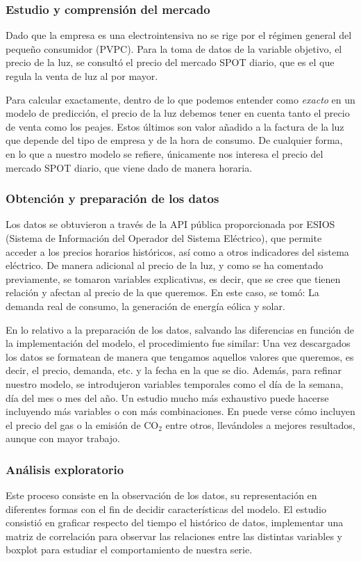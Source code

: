 \subsubsection{Estudio y comprensión del mercado}
%
%
%
Dado que la empresa es una electrointensiva no se rige por el régimen general del pequeño consumidor (PVPC). Para la toma de datos de la variable objetivo, el precio de la luz, se consultó el precio del mercado SPOT diario, que es el que regula la venta de luz al por mayor.

Para calcular exactamente, dentro de lo que podemos entender como \textit{exacto} en un modelo de predicción, el precio de la luz debemos tener en cuenta tanto el precio de venta como los peajes. Estos últimos son valor añadido a la factura de la luz que depende del tipo de empresa y de la hora de consumo. De cualquier forma, en lo que a nuestro modelo se refiere, únicamente nos interesa el precio del mercado SPOT diario, que viene dado de manera horaria.
%
%
%
\subsubsection{Obtención y preparación de los datos}
%
%
%
Los datos se obtuvieron a través de la API pública proporcionada por ESIOS (Sistema de Información del Operador del Sistema Eléctrico), que permite acceder a los precios horarios históricos, así como a otros indicadores del sistema eléctrico. De manera adicional al precio de la luz, y como se ha comentado previamente, se tomaron variables explicativas, es decir, que se cree que tienen relación y afectan al precio de la que queremos. En este caso, se tomó: La demanda real de consumo, la generación de energía eólica y solar.

En lo relativo a la preparación de los datos, salvando las diferencias en función de la implementación del modelo, el procedimiento fue similar: Una vez descargados los datos se formatean de manera que tengamos aquellos valores que queremos, es decir, el precio, demanda, etc. y la fecha en la que se dio. Además, para refinar nuestro modelo, se introdujeron variables temporales como el día de la semana, día del mes o mes del año. Un estudio mucho más exhaustivo puede hacerse incluyendo más variables o con más combinaciones. En \cite{TFG_prediccion} puede verse cómo incluyen el precio del gas o la emisión de CO$_2$ entre otros, llevándoles a mejores resultados, aunque con mayor trabajo.
%
%
%
\subsubsection{Análisis exploratorio}
%
%
%
Este proceso consiste en la observación de los datos, su representación en diferentes formas con el fin de decidir características del modelo. El estudio consistió en graficar respecto del tiempo el histórico de datos, implementar una matriz de correlación para observar las relaciones entre las distintas variables y boxplot para estudiar el comportamiento de nuestra serie.

